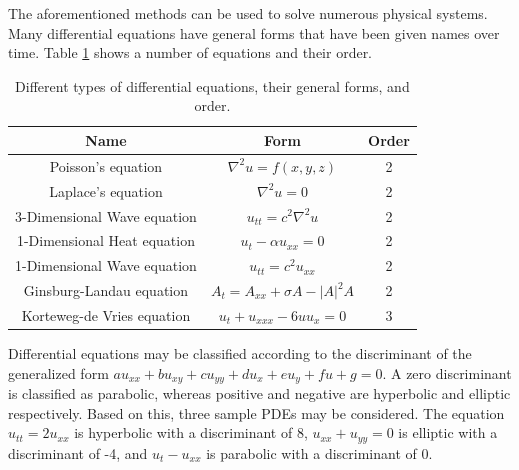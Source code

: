 \documentclass[twocolumn]{article}
\begin{document}
The aforementioned methods can be used to solve numerous physical systems. Many differential equations have general forms that have been given names over time. Table \ref{eq:diff_equations} shows a number of equations and their order.

\begin{table}
\begin{center}
\begin{tabular}{|c|c|c|}
	\hline Name                        & Form                                & Order \\ 
	\hline Poisson's equation          & $\nabla^2 u = f(x,y,z)$             & 2 \\ 
	\hline Laplace's equation          & $\nabla^2 u = 0$                    & 2 \\ 
	\hline 3-Dimensional Wave equation & $u_{tt} = c^2\nabla^2 u$            & 2 \\ 
	\hline 1-Dimensional Heat equation & $u_t -\alpha u_{xx} = 0$            & 2 \\ 
	\hline 1-Dimensional Wave equation & $u_{tt} = c^2 u_{xx} $              & 2 \\ 
	\hline Ginsburg-Landau equation    & $A_t = A_{xx} + \sigma A - |A|^2 A $& 2 \\ 
	\hline Korteweg-de Vries equation  & $u_t + u_{xxx} - 6u u_{x} = 0 $     & 3 \\ 
	\hline 
\end{tabular}  
\caption{Different types of differential equations, their general forms, and order.}
\label{eq:diff_equations}
\end{center}
\end{table}

Differential equations may be classified according to the discriminant of the generalized form $au_{xx} + bu_{xy} + cu_{yy} + du_{x} +eu_y +fu + g =0$. A zero discriminant is classified as parabolic, whereas positive and negative are hyperbolic and elliptic respectively. Based on this, three sample PDEs may be considered. The equation $u_{tt} = 2u_{xx}$ is hyperbolic with a discriminant of 8, $u_{xx} + u_{yy} = 0$ is elliptic with a discriminant of -4, and $u_t - u_{xx}$ is parabolic with a discriminant of 0.
\end{document}
